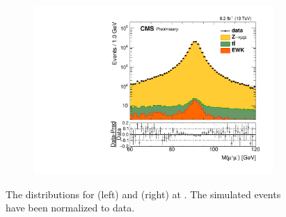 \begin{figure}
\begin{subfigure}{.50\textwidth}
\end{subfigure}%
\centering
\begin{subfigure}{.50\textwidth}
\centering
\includegraphics[width=\linewidth]{plots/Z/13tev/zmmlog.pdf}
\end{subfigure}%
\caption{The \mll distributions for \zee (left) and \zmm (right) at \serah. The simulated events have been normalized to data.}
\label{fig:z:z:13}
\end{figure}